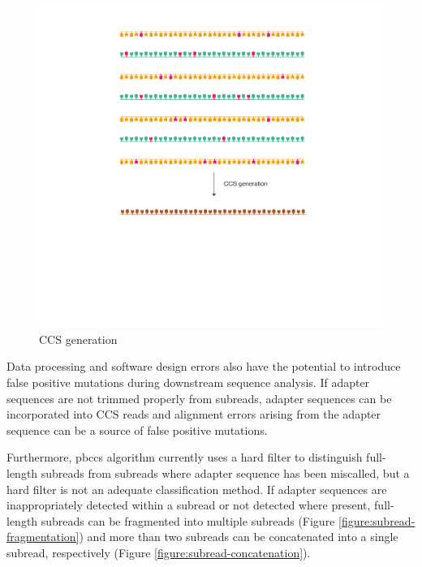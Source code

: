 \begin{figure}[htbp!]
\caption{CCS generation}
\label{figure:ccs-generation}
\begin{centering}
\includegraphics[width=1\textwidth]{Vector/ccs-generation.pdf}
\end{centering}
\end{figure}

Data processing and software design errors also have the potential to introduce false positive mutations during downstream sequence analysis. If adapter sequences are not trimmed properly from subreads, adapter sequences can be incorporated into CCS reads and alignment errors arising from the adapter sequence can be a source of false positive mutations. 

Furthermore, pbccs algorithm currently uses a hard filter to distinguish full-length subreads from subreads where adapter sequence has been miscalled, but a hard filter is not an adequate classification method.  If adapter sequences are inappropriately detected within a subread or not detected where present, full-length subreads can be fragmented into multiple subreads (Figure \ref{figure:subread-fragmentation}) and more than two subreads can be concatenated into a single subread, respectively (Figure \ref{figure:subread-concatenation}).

